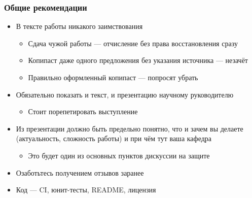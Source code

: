 \documentclass{../../slides-style}
\begin{document}
    \begin{frame}
        \frametitle{Общие рекомендации}
        \begin{itemize}
            \item В тексте работы никакого заимствования 
            \begin{itemize}
                \item Сдача чужой работы --- отчисление без права восстановления сразу
                \item Копипаст даже одного предложения без указания источника --- незачёт
                \item Правильно оформленный копипаст --- попросят убрать
            \end{itemize}
            \item Обязательно показать и текст, и презентацию научному руководителю
            \begin{itemize}
                \item Стоит порепетировать выступление
            \end{itemize}
            \item Из презентации должно быть предельно понятно, что и зачем вы делаете (актуальность, сложность работы) и при чём тут ваша кафедра
            \begin{itemize}
                \item Это будет один из основных пунктов дискуссии на защите
            \end{itemize}
            \item Озаботьтесь получением отзывов заранее
            \item Код --- CI, юнит-тесты, README, лицензия
        \end{itemize}
    \end{frame}
\end{document}
